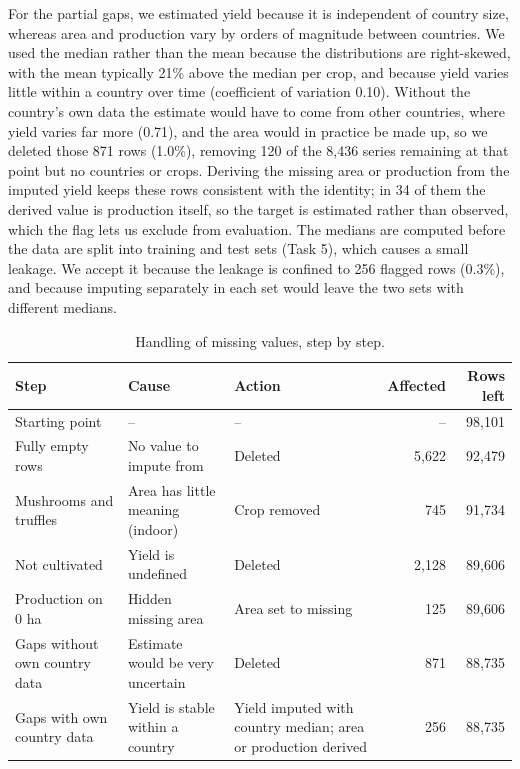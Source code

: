 \documentclass{article}
\begin{document}
For the partial gaps, we estimated yield because it is independent of country size, whereas area and production vary by orders of magnitude between countries. We used the median rather than the mean because the distributions are right-skewed, with the mean typically 21\% above the median per crop, and because yield varies little within a country over time (coefficient of variation 0.10). Without the country's own data the estimate would have to come from other countries, where yield varies far more (0.71), and the area would in practice be made up, so we deleted those 871 rows (1.0\%), removing 120 of the 8,436 series remaining at that point but no countries or crops. Deriving the missing area or production from the imputed yield keeps these rows consistent with the identity; in 34 of them the derived value is production itself, so the target is estimated rather than observed, which the flag lets us exclude from evaluation. The medians are computed before the data are split into training and test sets (Task 5), which causes a small leakage. We accept it because the leakage is confined to 256 flagged rows (0.3\%), and because imputing separately in each set would leave the two sets with different medians.

\begin{table}[H]
    \centering
    \small
    \begin{tabular}{p{2.9cm}p{3.1cm}p{3.5cm}rr}
        \toprule
        Step & Cause & Action & Affected & Rows left \\
        \midrule
        Starting point & -- & -- & -- & 98,101 \\
        Fully empty rows & No value to impute from & Deleted & 5,622 & 92,479 \\
        Mushrooms and truffles & Area has little meaning (indoor) & Crop removed & 745 & 91,734 \\
        Not cultivated & Yield is undefined & Deleted & 2,128 & 89,606 \\
        Production on 0 ha & Hidden missing area & Area set to missing & 125 & 89,606 \\
        Gaps without own country data & Estimate would be very uncertain & Deleted & 871 & 88,735 \\
        Gaps with own country data & Yield is stable within a country & Yield imputed with country median; area or production derived & 256 & 88,735 \\
        \bottomrule
    \end{tabular}
    \caption{Handling of missing values, step by step.}
    \label{tab:missing}
\end{table}
\end{document}
